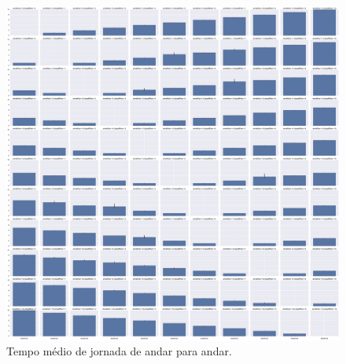 \begin{figure}[htb!]
  \centering
  \includegraphics[scale=0.2]{img/results/Low-rise/5_Planning_Random/averageTravelTime.eps}
  \caption{Tempo médio de jornada de andar para andar.}
  \label{fig:graphs:averageTravelTime}
\end{figure}
